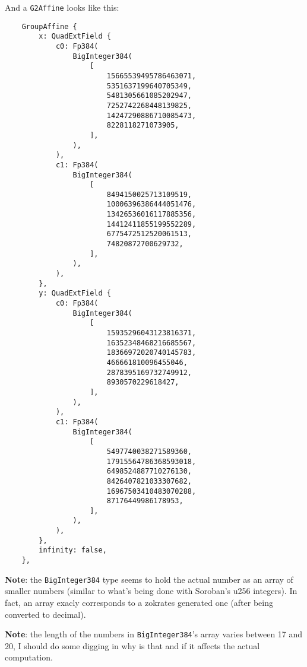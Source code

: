 \documentclass{article}
\begin{document}
And a \lstinline{G2Affine} looks like this:

\begin{lstlisting}
    GroupAffine {
        x: QuadExtField {
            c0: Fp384(
                BigInteger384(
                    [
                        15665539495786463071,
                        5351637199640705349,
                        5481305661085202947,
                        7252742268448139825,
                        14247290886710085473,
                        8228118271073905,
                    ],
                ),
            ),
            c1: Fp384(
                BigInteger384(
                    [
                        8494150025713109519,
                        10006396386444051476,
                        13426536016117885356,
                        14412411855199552289,
                        6775472512520061513,
                        74820872700629732,
                    ],
                ),
            ),
        },
        y: QuadExtField {
            c0: Fp384(
                BigInteger384(
                    [
                        15935296043123816371,
                        16352348468216685567,
                        18366972020740145783,
                        466661810096455046,
                        2878395169732749912,
                        8930570229618427,
                    ],
                ),
            ),
            c1: Fp384(
                BigInteger384(
                    [
                        5497740038271589360,
                        17915564786368593018,
                        6498524887710276130,
                        8426407821033307682,
                        16967503410483070288,
                        87176449986178953,
                    ],
                ),
            ),
        },
        infinity: false,
    },

\end{lstlisting}

\textbf{Note}: the \lstinline{BigInteger384} type seems to hold the actual number as an array of smaller numbers (similar to what's being done with Soroban's u256 integers). In fact, an array exacly corresponds to a zokrates generated one (after being converted to decimal).

\textbf{Note}: the length of the numbers in \lstinline{BigInteger384}'s array varies between 17 and 20, I should do some digging in why is that and if it affects the actual computation.
\end{document}
